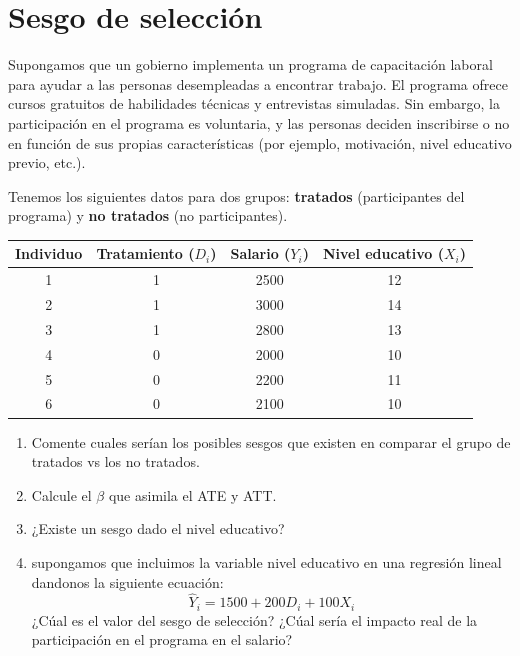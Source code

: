 \documentclass[10pt,a4paper]{article}
\begin{document}
\section{Sesgo de selección}
Supongamos que un gobierno implementa un programa de capacitación laboral para ayudar a las personas desempleadas a encontrar trabajo. El programa ofrece cursos gratuitos de habilidades técnicas y entrevistas simuladas. Sin embargo, la participación en el programa es voluntaria, y las personas deciden inscribirse o no en función de sus propias características (por ejemplo, motivación, nivel educativo previo, etc.).

Tenemos los siguientes datos para dos grupos: \textbf{tratados} (participantes del programa) y \textbf{no tratados} (no participantes).

\begin{center}
\begin{tabular}{|c|c|c|c|}
\hline
Individuo & Tratamiento (\( D_i \)) & Salario (\( Y_i \)) & Nivel educativo (\( X_i \)) \\
\hline
1 & 1 & 2500 & 12 \\
2 & 1 & 3000 & 14 \\
3 & 1 & 2800 & 13 \\
4 & 0 & 2000 & 10 \\
5 & 0 & 2200 & 11 \\
6 & 0 & 2100 & 10 \\
\hline
\end{tabular}
\end{center}

\begin{enumerate}
    \item Comente cuales serían los posibles sesgos que existen en comparar el grupo de tratados vs los no tratados.

    \item Calcule el $\beta$ que asimila el ATE y ATT. 

    \item ¿Existe un sesgo dado el nivel educativo?

    \item supongamos que incluimos la variable nivel educativo en una regresión lineal dandonos la siguiente ecuación: 
    $$\hat{Y}_i = 1500+200D_i + 100X_i$$
    ¿Cúal es el valor del sesgo de selección? ¿Cúal sería el impacto real de la participación en el programa en el salario?
\end{enumerate}
\end{document}
